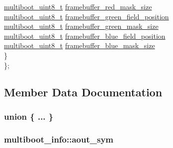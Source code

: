 \begin{DoxyCompactItemize}
\begin{tabbing}
\>\>\hyperlink{multiboot_8h_a037f602538fccf97e90021c19fdfc047}{multiboot\_uint8\_t} \hyperlink{structmultiboot__info_a12b01720d430270e5afc2b28f3318e3d}{framebuffer\_red\_mask\_size}\\
\>\>\hyperlink{multiboot_8h_a037f602538fccf97e90021c19fdfc047}{multiboot\_uint8\_t} \hyperlink{structmultiboot__info_a2fe2ac9812c7ff88c7eeb306bd836fe3}{framebuffer\_green\_field\_position}\\
\>\>\hyperlink{multiboot_8h_a037f602538fccf97e90021c19fdfc047}{multiboot\_uint8\_t} \hyperlink{structmultiboot__info_a18cfe05edd236d9ddbbd3d0118d22e47}{framebuffer\_green\_mask\_size}\\
\>\>\hyperlink{multiboot_8h_a037f602538fccf97e90021c19fdfc047}{multiboot\_uint8\_t} \hyperlink{structmultiboot__info_aef7453a08ec80dcd5f2645bec2995a0f}{framebuffer\_blue\_field\_position}\\
\>\>\hyperlink{multiboot_8h_a037f602538fccf97e90021c19fdfc047}{multiboot\_uint8\_t} \hyperlink{structmultiboot__info_a0409fd6c556aa388c7845a222957e455}{framebuffer\_blue\_mask\_size}\\
\>\} \\
\}; \\

\end{tabbing}\end{DoxyCompactItemize}


\subsection{Member Data Documentation}
\hypertarget{structmultiboot__info_af694b7644759d2f7526a0b9182426207}{}\subsubsection[{"@2}]{\setlength{\rightskip}{0pt plus 5cm}union \{ ... \} }\label{structmultiboot__info_af694b7644759d2f7526a0b9182426207}
\hypertarget{structmultiboot__info_acf01e96c5d199a398901516df535a5bb}{}
\subsubsection[{aout\+\_\+sym}]{ multiboot\+\_\+info\+::aout\+\_\+sym}\label{structmultiboot__info_acf01e96c5d199a398901516df535a5bb}
\hypertarget{structmultiboot__info_ad4285d60142d241a9e6b68a03e62ee0a}{}
